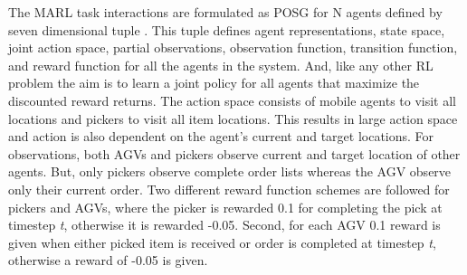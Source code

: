 \documentclass{article}
\begin{document}
The MARL task interactions are formulated as POSG for N agents defined by seven dimensional tuple \cite{hansen2004dynamic}.
This tuple defines agent representations, state space, joint action space, partial observations, observation function, transition function, and reward function for all the agents in the system.
And, like any other RL problem the aim is to learn a joint policy for all agents that maximize the discounted reward returns.
The action space consists of mobile agents to visit all locations and pickers to visit all item locations.
This results in large action space and action is also dependent on the agent’s current and target locations.
For observations, both AGVs and pickers observe current and target location of other agents. But, only pickers observe complete order lists whereas the AGV observe only their current order.
Two different reward function schemes are followed for pickers and AGVs, where the picker is rewarded 0.1 for completing the pick at timestep \textit{t}, otherwise it is rewarded -0.05.
Second, for each AGV 0.1 reward is given when either picked item is received or order is completed at timestep \textit{t}, otherwise a reward of -0.05 is given.
\end{document}
